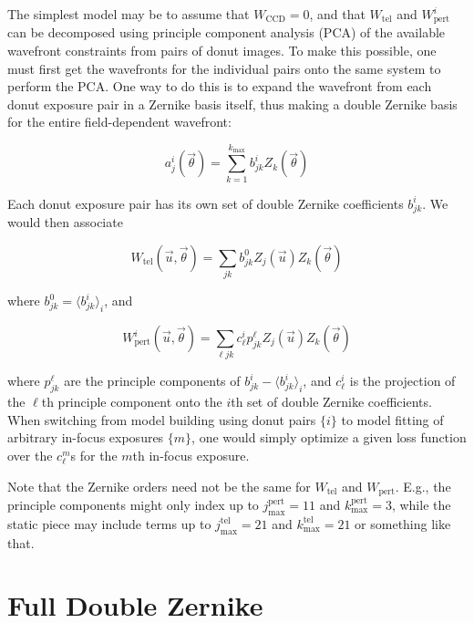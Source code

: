 \documentclass{article}
\begin{document}
The simplest model may be to assume that $W_\mathrm{CCD} = 0$, and that $W_\mathrm{tel}$ and
$W_\mathrm{pert}^i$ can be decomposed using principle component analysis (PCA) of the available
wavefront constraints from pairs of donut images.  To make this possible, one must first get the
wavefronts for the individual pairs onto the same system to perform the PCA.  One way to do this is
to expand the wavefront from each donut exposure pair in a Zernike basis itself, thus making a
double Zernike basis for the entire field-dependent wavefront:

\begin{equation}
    a_j^i(\vec{\theta}) = \sum_{k=1}^{k_\mathrm{max}} b_{jk}^i Z_k(\vec{\theta})
\end{equation}

Each donut exposure pair has its own set of double Zernike coefficients $b_{jk}^i$.  We would then
associate

\begin{equation}
    W_\mathrm{tel}(\vec{u}, \vec{\theta}) = \sum_{jk} b_{jk}^0 Z_j(\vec{u}) Z_k(\vec{\theta})
\end{equation}

where $b_{jk}^0 = \langle b_{jk}^i \rangle_i$, and

\begin{equation}
    W_\mathrm{pert}^i(\vec{u}, \vec{\theta}) = \sum_{\ell j k} c^i_\ell p^\ell_{jk} Z_j(\vec{u}) Z_k(\vec{\theta})
\end{equation}

where $p^\ell_{jk}$ are the principle components of $b^i_{jk} - \langle b^i_{jk}\rangle_i$, and
$c_\ell^i$ is the projection of the $\ell$th principle component onto the $i$th set of double
Zernike coefficients.  When switching from model building using donut pairs $\{i\}$ to model fitting
of arbitrary in-focus exposures $\{m\}$, one would simply optimize a given loss function over the
$c^m_\ell$s for the $m$th in-focus exposure.

Note that the Zernike orders need not be the same for $W_\mathrm{tel}$ and $W_\mathrm{pert}$. E.g.,
the principle components might only index up to $j^\mathrm{pert}_\mathrm{max}=11$ and
$k^\mathrm{pert}_\mathrm{max}=3$, while the static piece may include terms up to
$j^\mathrm{tel}_\mathrm{max}=21$ and $k^\mathrm{tel}_\mathrm{max}=21$ or something like that.

\section{Full Double Zernike}
\end{document}
